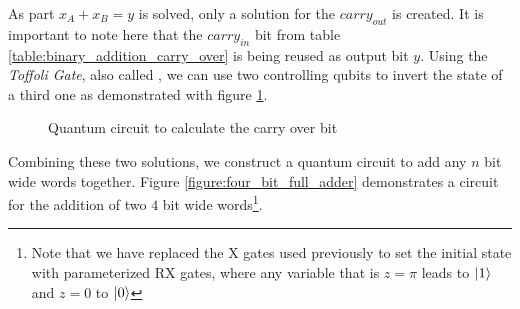 \newpage


As part $x_A + x_B = y$ is solved, only a solution for the $carry_{out}$ is created. It is important to note here that the $carry_{in}$ bit from table \ref{table:binary_addition_carry_over} is being reused as output bit $y$. Using the \emph{Toffoli Gate}, also called \cite{qiskit_ccxgate_nodate}, we can use two controlling qubits to invert the state of a third one as demonstrated with figure \ref{fig:carry_over_circuit}.

\begin{figure}[!h]
    \centering
    \caption{Quantum circuit to calculate the carry over bit}
    \label{fig:carry_over_circuit}
\end{figure}

Combining these two solutions, we construct a quantum circuit to add any $n$ bit wide words together. Figure \ref{figure:four_bit_full_adder} demonstrates a circuit for the addition of two $4$ bit wide words\footnote{Note that we have replaced the X gates used previously to set the initial state with parameterized RX gates, where any variable that is $z = \pi$ leads to $\ket{1}$ and $z = 0$ to $\ket{0}$}.

